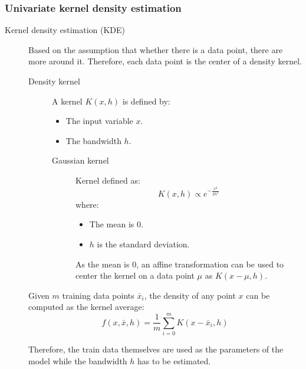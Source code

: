 \subsubsection{Univariate kernel density estimation} \label{sec:ad_taxi_kde_uni}

\begin{description}
    \item[Kernel density estimation (KDE)] 
        Based on the assumption that whether there is a data point, there are more around it. Therefore, each data point is the center of a density kernel.

        \begin{description}
            \item[Density kernel] 
                A kernel $K(x, h)$ is defined by:
                \begin{itemize}
                    \item The input variable $x$.
                    \item The bandwidth $h$.
                \end{itemize}
        
                \begin{description}
                    \item[Gaussian kernel]
                        Kernel defined as:
                        \[ K(x, h) \propto e^{-\frac{x^2}{2h^2}} \]
                        where:
                        \begin{itemize}
                            \item The mean is $0$.
                            \item $h$ is the standard deviation.
                        \end{itemize}
                        As the mean is $0$, an affine transformation can be used to center the kernel on a data point $\mu$ as $K(x - \mu, h)$.
                \end{description}
        \end{description}

        Given $m$ training data points $\bar{x}_i$, the density of any point $x$ can be computed as the kernel average:
        \[ f(x, \bar{x}, h) = \frac{1}{m} \sum_{i=0}^{m} K(x - \bar{x}_i, h) \]

        Therefore, the train data themselves are used as the parameters of the model while the bandwidth $h$ has to be estimated. 


\end{description}
